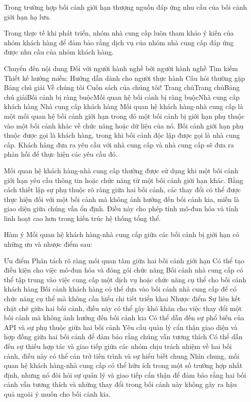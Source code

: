 

Trong trường hợp bối cảnh giới hạn thượng nguồn đáp ứng nhu cầu của bối cảnh giới hạn hạ lưu.

Trong thực tế khi phát triển, nhóm nhà cung cấp luôn tham khảo ý kiến của nhóm khách hàng để đảm bảo rằng dịch vụ của nhóm nhà cung cấp đáp ứng được nhu cầu của nhóm khách hàng.



Chuyển đến nội dung
Đối với người hành nghề bởi người hành nghề
Tìm kiếm
Thiết kế hướng miền: Hướng dẫn dành cho người thực hành
Câu hỏi thường gặp
Bảng chú giải
Về chúng tôi
Cuốn sách của chúng tôi!
Trang chủTrang chủBảng chú giảiBối cảnh bị ràng buộcMối quan hệ bối cảnh bị ràng buộcNhà cung cấp khách hàng
Nhà cung cấp khách hàng
Mối quan hệ khách hàng-nhà cung cấp là một mối quan hệ bối cảnh giới hạn trong đó một bối cảnh bị giới hạn phụ thuộc vào một bối cảnh khác về chức năng hoặc dữ liệu của nó. Bối cảnh giới hạn phụ thuộc được gọi là khách hàng, trong khi bối cảnh độc lập được gọi là nhà cung cấp. Khách hàng đưa ra yêu cầu với nhà cung cấp và nhà cung cấp sẽ đưa ra phản hồi để thực hiện các yêu cầu đó.

Mối quan hệ khách hàng-nhà cung cấp thường được sử dụng khi một bối cảnh giới hạn yêu cầu thông tin hoặc chức năng từ một bối cảnh giới hạn khác. Bằng cách thiết lập sự phụ thuộc rõ ràng giữa hai bối cảnh, các thay đổi có thể được thực hiện đối với một bối cảnh mà không ảnh hưởng đến bối cảnh kia, miễn là giao diện giữa chúng vẫn ổn định. Điều này cho phép tính mô-đun hóa và tính linh hoạt cao hơn trong kiến ​​trúc hệ thống tổng thể.

Hàm ý
Mối quan hệ khách hàng-nhà cung cấp giữa các bối cảnh bị giới hạn có những ưu và nhược điểm sau:

Ưu điểm
Phân tách rõ ràng mối quan tâm giữa hai bối cảnh giới hạn
Có thể tạo điều kiện cho việc mô-đun hóa và đóng gói chức năng
Bối cảnh nhà cung cấp có thể tập trung vào việc cung cấp một dịch vụ hoặc chức năng cụ thể cho bối cảnh khách hàng
Bối cảnh khách hàng có thể dựa vào bối cảnh nhà cung cấp để có chức năng cụ thể mà không cần hiểu chi tiết triển khai
Nhược điểm
Sự liên kết chặt chẽ giữa hai bối cảnh, điều này có thể gây khó khăn cho việc thay đổi một bối cảnh mà không ảnh hưởng đến bối cảnh kia
Có thể dẫn đến sự phổ biến của API và sự phụ thuộc giữa hai bối cảnh
Yêu cầu quản lý cẩn thận giao diện và hợp đồng giữa hai bối cảnh để đảm bảo rằng chúng vẫn tương thích
Có thể dẫn đến sự thiếu hợp tác và giao tiếp giữa các nhóm chịu trách nhiệm về hai bối cảnh, điều này có thể cản trở tiến trình và sự hiểu biết chung
Nhìn chung, mối quan hệ khách hàng-nhà cung cấp có thể hữu ích trong một số trường hợp nhất định, nhưng nó đòi hỏi sự quản lý và giao tiếp cẩn thận để đảm bảo rằng hai bối cảnh vẫn tương thích và những thay đổi trong bối cảnh này không gây ra hậu quả ngoài ý muốn cho bối cảnh kia.

